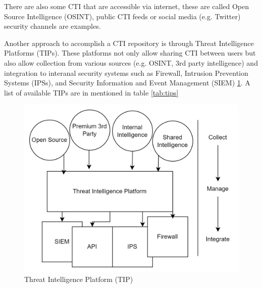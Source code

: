 There are also some CTI that are accessible via internet, these are called Open Source Intelligence (OSINT), public CTI feeds or social media (e.g. Twitter) security channels are examples.

Another approach to accomplish a CTI repository is through Threat Intelligence Platforms (TIPs). These platforms not only allow sharing CTI between users but also allow collection from various sources (e.g. OSINT, 3rd party intelligence) and integration to interanal security systems such as Firewall, Intrusion Prevention Systems (IPSs), and Security Information and Event Management (SIEM) \ref{fig:tip}. A list of available TIPs are in mentioned in table \ref{tab:tips}

\begin{figure}[ht]
    \centering
    \includegraphics[width=\textwidth]{diagrams/background/threat-intelligence-platform.png}
    \caption{Threat Intelligence Platform (TIP) \cite{anomali_tip_2024}}
    \label{fig:tip}
\end{figure}

